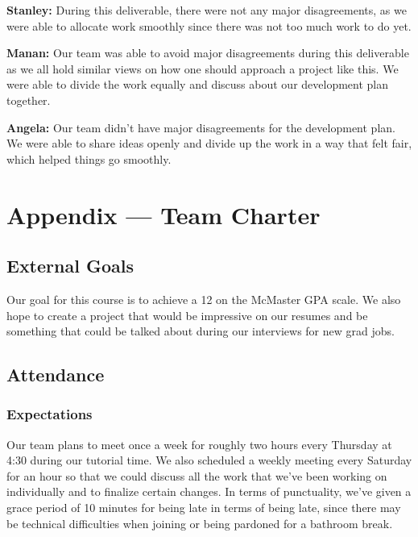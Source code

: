 \documentclass{article}
\begin{document}
\begin{enumerate}
\textbf{Stanley:} During this deliverable, there were not any major disagreements, as we were able to allocate work smoothly since there was not too much work to do yet.

\textbf{Manan:} Our team was able to avoid major disagreements during this deliverable as we all hold similar views on how one should approach a project like this. We were able to divide the work equally and discuss about our development plan together.

\textbf{Angela:} Our team didn’t have major disagreements for the development plan. We were able to share ideas openly and divide up the work in a way that felt fair, which helped things go smoothly.  

\end{enumerate}

\newpage{}

\section*{Appendix --- Team Charter}


\subsection*{External Goals}

Our goal for this course is to achieve a 12 on the McMaster GPA scale. We also hope to create a project that would be impressive on our resumes and be something that could be talked about during our interviews for new grad jobs. 

\subsection*{Attendance}

\subsubsection*{Expectations}

Our team plans to meet once a week for roughly two hours every Thursday at 4:30 during our tutorial time. We also scheduled a weekly meeting every Saturday for an hour so that we could discuss all the work that we’ve been working on individually and to finalize certain changes. In terms of punctuality, we’ve given a grace period of 10 minutes for being late in terms of being late, since there may be technical difficulties when joining or being pardoned for a bathroom break. 
\end{document}
